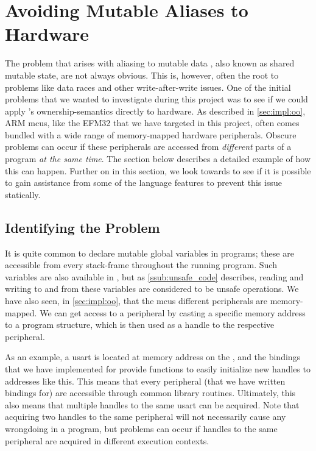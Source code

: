 
\section{Avoiding Mutable Aliases to Hardware}
\label{sec:avoiding_mutable_aliases_to_hardware}

The problem that arises with aliasing to mutable data \cite{web:problem_with_shared_mutability}, also known as shared mutable state, are not always obvious.
This is, however, often the root to problems like data races and other write-after-write issues.
One of the initial problems that we wanted to investigate during this project was to see if we could apply {\rust}'s ownership-semantics directly to hardware.
As described in \autoref{sec:impl:oo}, ARM \glspl{mcu}, like the EFM32 that we have targeted in this project, often comes bundled with a wide range of memory-mapped hardware peripherals.
Obscure problems can occur if these peripherals are accessed from \emph{different} parts of a program \emph{at the same time}.
The section below describes a detailed example of how this can happen.
Further on in this section, we look towards {\rust} to see if it is possible to gain assistance from some of the language features to prevent this issue statically.

\subsection{Identifying the Problem}

It is quite common to declare mutable global variables in {\C} programs; these are accessible from every stack-frame throughout the running program.
Such variables are also available in {\rust}, but as \autoref{ssub:unsafe_code} describes, reading and writing to and from these variables are considered to be unsafe operations.
We have also seen, in \autoref{sec:impl:oo}, that the \glspl{mcu} different peripherals are memory-mapped.
We can get access to a peripheral by casting a specific memory address to a program structure, which is then used as a handle to the respective peripheral.

As an example, a \gls{usart} is located at memory address  on the {\gecko}, and the bindings that we have implemented for {\emlib} provide functions to easily initialize new handles to addresses like this.
This means that every peripheral (that we have written bindings for) are accessible through common library routines.
Ultimately, this also means that multiple handles to the same \gls{usart} can be acquired.
Note that acquiring two handles to the same peripheral will not necessarily cause any wrongdoing in a program, but problems can occur if handles to the same peripheral are acquired in different execution contexts.

